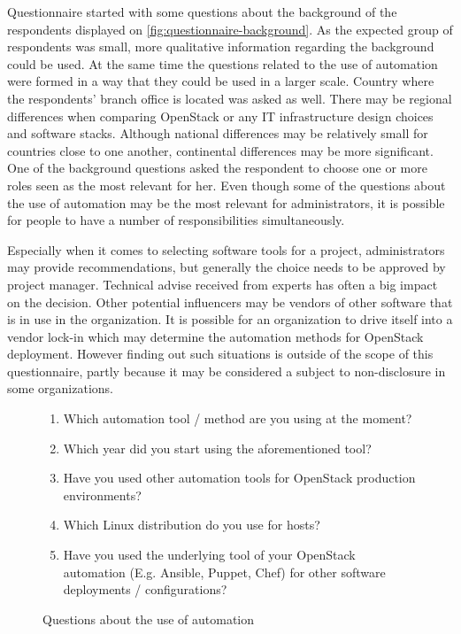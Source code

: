 Questionnaire started with some questions about the background of the
respondents displayed on \ref{fig:questionnaire-background}. As the
expected group of respondents was small, more qualitative information regarding
the background could be used. At the same time the questions related to the use
of automation were formed in a way that they could be used in a larger scale.
Country where the respondents' branch office is located was asked as well.
There may be regional differences when comparing OpenStack or any IT
infrastructure design choices and software stacks. Although national
differences may be relatively small for countries close to one another,
continental differences may be more significant. One of the background
questions asked the respondent to choose one or more roles seen as the most
relevant for her. Even though some of the questions about the use of automation
may be the most relevant for administrators, it is possible for people to have
a number of responsibilities simultaneously.

Especially when it comes to selecting software tools for a project,
administrators may provide recommendations, but generally the choice needs to
be approved by project manager. Technical advise received from experts has
often a big impact on the decision. Other potential influencers may be vendors
of other software that is in use in the organization. It is possible for an
organization to drive itself into a vendor lock-in which may determine the
automation methods for OpenStack deployment. However finding out such
situations is outside of the scope of this questionnaire, partly because it may
be considered a subject to non-disclosure in some organizations.

\begin{figure}[t]
\centering
\begin{enumerate}
  \itemsep0em
  \item Which automation tool / method are you using at the moment?
  \item Which year did you start using the aforementioned tool?
  \item Have you used other automation tools for OpenStack production
        environments?
  \item Which Linux distribution do you use for hosts?
  \item Have you used the underlying tool of your OpenStack automation (E.g.
        Ansible, Puppet, Chef) for other software deployments / configurations?
\end{enumerate}
\caption{Questions about the use of automation}
\label{fig:questionnaire-tool-details}
\end{figure}

